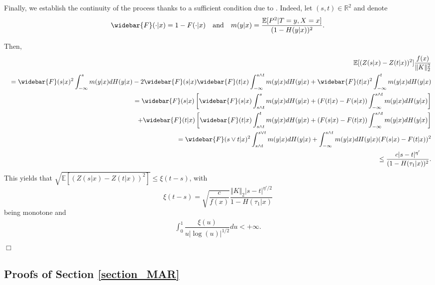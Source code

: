 \documentclass[12pt]{article}
\begin{document}
Finally, we establish the continuity of the process thanks to a sufficient condition due to \cite{Fernique1964}. Indeed, let $(s,t)\in\mathbb{R}^2$ and denote 
\begin{eqnarray*}
\widebar{F}(\cdot|x)=1-F(\cdot|x)\quad\text{and}\quad m(y|x)=\dfrac{\mathbb{E}[P^2|T=y,X=x]}{(1-H(y|x))^2}.
\end{eqnarray*}

Then,
\begin{eqnarray*}
&&\mathbb{E}[(Z(s|x)-Z(t|x))^2]\dfrac{f(x)}{\Vert K\Vert ^2_2}\\
&&=\widebar{F}(s|x)^2\int_{-\infty}^{s}m(y|x)dH(y|x) -2\widebar{F}(s|x)\widebar{F}(t|x)\int_{-\infty}^{s\wedge t}m(y|x)dH(y|x)+\widebar{F}(t|x)^2\int_{-\infty}^{t}m(y|x)dH(y|x)\\
&&=\widebar{F}(s|x)\left[\widebar{F}(s|x)\int_{s\wedge t}^{s}m(y|x)dH(y|x)+(F(t|x)-F(s|x))\int_{-\infty}^{s\wedge t}m(y|x)dH(y|x)\right]\\
&& \quad +\widebar{F}(t|x)\left[\widebar{F}(t|x)\int_{s\wedge t}^{t}m(y|x)dH(y|x)+(F(s|x)-F(t|x))\int_{-\infty}^{s\wedge t}m(y|x)dH(y|x)\right]\\
&&=\widebar{F}(s\vee t|x)^2\int_{s\wedge t}^{s\vee t}m(y|x)dH(y|x)+\int_{-\infty}^{s\wedge t}m(y|x)dH(y|x)(F(s|x)-F(t|x))^2\\
&&\leq \dfrac{c|s-t|^{\eta'}}{(1-H(\tau_1|x))^2}.
\end{eqnarray*}
This yields that $\sqrt{\mathbb{E}[(Z(s|x)-Z(t|x))^2]}\leq\xi(t-s)$, with 
$$ \xi(t-s)=\sqrt{\dfrac{c}{f(x)}}\dfrac{\Vert K\Vert_2|s-t|^{\eta'/2}}{1-H(\tau_1|x)} $$ 
being monotone and
\begin{eqnarray*}
\int_0^1\dfrac{\xi(u)}{u|\log(u)|^{1/2}}du<+\infty. \\[-1.6cm]
\end{eqnarray*}
\hfill$\Box$\\

\subsection{Proofs of Section \ref{section_MAR}}
 
  
  
\end{document}
